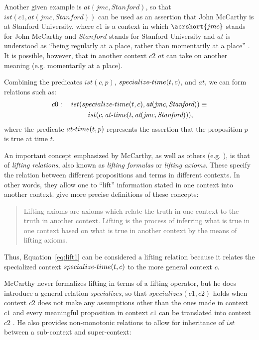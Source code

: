 Another given example is $at(jmc, Stanford)$, so that $ist(c1, at(jmc, Stanford))$ can be used as an assertion that John McCarthy  is at Stanford University, where $c1$ is a context in which $\acrshort{jmc}$ stands for John McCarthy and $Stanford$ stands for Stanford University and $at$ is understood as ``being regularly at a place, rather than momentarily at a place'' \cite{McCarthy1993}. It is possible, however, that in another context $c2$ $at$ can take on another meaning (e.g. momentarily at a place).

Combining the predicates $ist(c, p)$, $specialize\textnormal{-}time(t, c)$, and $at$, we can form relations such as:
\begin{equation}
\label{eq:lift1}
\begin{aligned}
c0: \quad ist(specialize\textnormal{-}time(t,c),\hbox{\it at}
(\hbox{\it jmc},\hbox{\it Stanford}))
\equiv \\
ist(c,\hbox{\it at-time}(t,\hbox{\it at}(\hbox{\it jmc},
\hbox{\it Stanford}))),
\qquad
\end{aligned}
\end{equation}
where the predicate $at\textnormal{-}time(t,p)$ represents the assertion that the proposition $p$ is true at time $t$. 

An important concept emphasized by McCarthy, as well as others (e.g. \cite{guha1991contexts}), is that of \emph{lifting relations}, also known as \emph{lifting formulas} or \emph{lifting axioms}. These specify the relation between different propositions and terms in different contexts. In other words, they allow one to ``lift'' information stated in one context into another context. \cite{mccarthy1997formalizing} give more precise definitions of these concepts:
\begin{quote}
Lifting axioms are axioms which relate the truth in one context
to the truth in another context.
Lifting is the process of inferring what is true in one context based
on what is true in another context by the means of lifting axioms.
\end{quote}
Thus, Equation~\ref{eq:lift1} can be considered a lifting relation because it relates the specialized context $specialize\textnormal{-}time(t, c)$ to the more general context $c$. 

McCarthy never formalizes lifting in terms of a lifting operator, but he does introduce a general relation \emph{specializes}, so that $specializes(c1,c2)$ holds when context $c2$ does not make any assumptions other than the ones made in context $c1$ and every meaningful proposition in context $c1$ can be translated into context $c2$ \cite{McCarthy1993}. He also provides non-monotonic relations to allow for inheritance of $ist$ between a sub-context and super-context:

